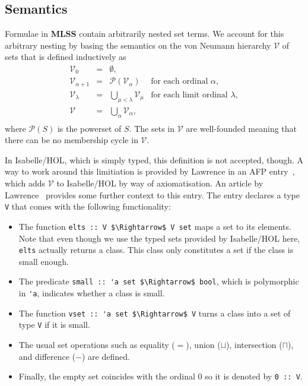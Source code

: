 \documentclass[sigplan,10pt,anonymous,review]{acmart}
\newcommand{\MLSS}{\textbf{MLSS}}
\begin{document}
\subsection{Semantics}
Formulae in \MLSS{} contain arbitrarily nested set terms.
We account for this arbitrary nesting by basing the semantics on the von Neumann hierarchy $\mathcal{V}$ of sets that is defined inductively as
  \[
    \begin{array}{rclr}
      \mathcal{V}_0 & = & \emptyset, \\
      \mathcal{V}_{\alpha + 1} & = & \mathcal{P}(\mathcal{V}_\alpha) & \text{for each ordinal $\alpha$}, \\
      \mathcal{V}_{\lambda} & = & \bigcup_{\mu < \lambda} \mathcal{V}_\mu & \text{for each limit ordinal $\lambda$}, \\
      \mathcal{V} & = & \bigcup_\alpha \mathcal{V}_\alpha, \\
    \end{array}
  \]
where $\mathcal{P}(S)$ is the powerset of $S$.
The sets in $\mathcal{V}$ are well-founded meaning that there can be no membership cycle in $\mathcal{V}$.

In Isabelle/HOL, which is simply typed, this definition is not accepted, though.
A way to work around this limitiation is provided by Lawrence in an AFP entry~\cite{zfc_in_hol_afp}, which adds $\mathcal{V}$ to Isabelle/HOL by way of axiomatisation.
An article by Lawrence~\cite{zfc_in_hol} provides some further context to this entry.
The entry declares a type \lstinline!V! that comes with the following functionality:
\begin{itemize}
  \item The function \lstinline!elts :: V $\Rightarrow$ V set! maps a set to its elements.
      Note that even though we use the typed sets provided by Isabelle/HOL here, \lstinline!elts! actually returns a class.
      This class only constitutes a set if the class is small enough.
  \item The predicate \lstinline!small :: 'a set $\Rightarrow$ bool!, which is polymorphic in \lstinline!'a!, indicates whether a class is small.
  \item The function \lstinline!vset :: 'a set $\Rightarrow$ V! turns a class into a set of type \lstinline!V! if it is small. 
\item The usual set operations such as equality ($=$), union ($\sqcup$), intersection ($\sqcap$), and difference ($-$) are defined.
\item Finally, the empty set coincides with the ordinal $0$ so it is denoted by \lstinline!0 :: V!.
\end{itemize}
\end{document}

